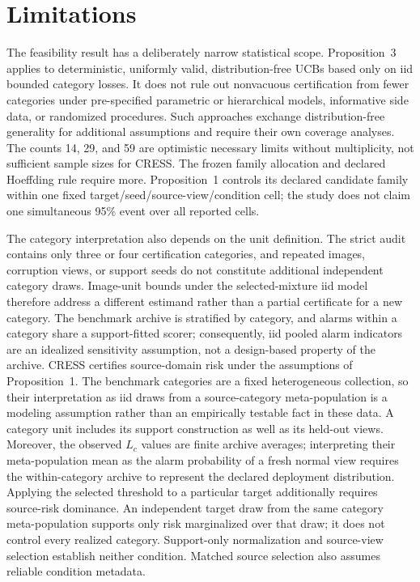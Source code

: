 \section{Limitations}\label{sec:limitations}
The feasibility result has a deliberately narrow statistical scope. Proposition~3 applies to deterministic, uniformly valid, distribution-free UCBs based only on iid bounded category losses. It does not rule out nonvacuous certification from fewer categories under pre-specified parametric or hierarchical models, informative side data, or randomized procedures. Such approaches exchange distribution-free generality for additional assumptions and require their own coverage analyses. The counts 14, 29, and 59 are optimistic necessary limits without multiplicity, not sufficient sample sizes for CRESS\@. The frozen family allocation and declared Hoeffding rule require more. Proposition~1 controls its declared candidate family within one fixed target/seed/source-view/condition cell; the study does not claim one simultaneous 95\% event over all reported cells.

The category interpretation also depends on the unit definition. The strict audit contains only three or four certification categories, and repeated images, corruption views, or support seeds do not constitute additional independent category draws. Image-unit bounds under the selected-mixture iid model therefore address a different estimand rather than a partial certificate for a new category. The benchmark archive is stratified by category, and alarms within a category share a support-fitted scorer; consequently, iid pooled alarm indicators are an idealized sensitivity assumption, not a design-based property of the archive. CRESS certifies source-domain risk under the assumptions of Proposition~1. The benchmark categories are a fixed heterogeneous collection, so their interpretation as iid draws from a source-category meta-population is a modeling assumption rather than an empirically testable fact in these data. A category unit includes its support construction as well as its held-out views. Moreover, the observed $L_c$ values are finite archive averages; interpreting their meta-population mean as the alarm probability of a fresh normal view requires the within-category archive to represent the declared deployment distribution. Applying the selected threshold to a particular target additionally requires source-risk dominance. An independent target draw from the same category meta-population supports only risk marginalized over that draw; it does not control every realized category. Support-only normalization and source-view selection establish neither condition. Matched source selection also assumes reliable condition metadata.


